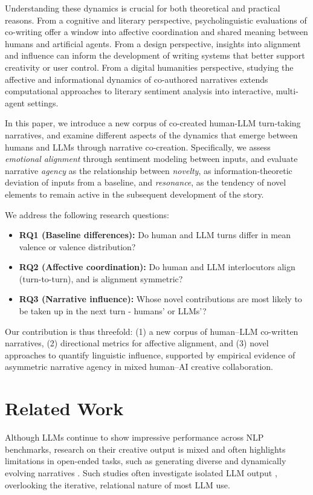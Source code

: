 \documentclass[11pt]{article}
\begin{document}
Understanding these dynamics is crucial for both theoretical and practical reasons. From a cognitive and literary perspective, psycholinguistic evaluations of co-writing offer a window into affective coordination and shared meaning between humans and artificial agents. From a design perspective, insights into alignment and influence can inform the development of writing systems that better support creativity or user control. From a digital humanities perspective, studying the affective and informational dynamics of co-authored narratives extends computational approaches to literary sentiment analysis into interactive, multi-agent settings.

In this paper, we introduce a new corpus of co-created human-LLM turn-taking narratives, and examine different aspects of the dynamics that emerge between humans and LLMs through narrative co-creation. Specifically, we assess \textit{emotional alignment} through sentiment modeling between inputs, and evaluate narrative \textit{agency} as the relationship between \textit{novelty}, as information-theoretic deviation of inputs from a baseline, and \textit{resonance}, as the tendency of novel elements to remain active in the subsequent development of the story.  

We address the following research questions:

\begin{itemize}
    \item \textbf{RQ1 (Baseline differences):} Do human and LLM turns differ in mean valence or valence distribution?
    \item \textbf{RQ2 (Affective coordination):} Do human and LLM interlocutors align (turn-to-turn), and is alignment symmetric?
    \item \textbf{RQ3 (Narrative influence):} Whose novel contributions are most likely to be taken up in the next turn - humans' or LLMs'?
\end{itemize}

Our contribution is thus threefold: (1) a new corpus of human–LLM co-written narratives, (2) directional metrics for affective alignment, and (3) novel approaches to quantify linguistic influence, supported by empirical evidence of asymmetric narrative agency in mixed human–AI creative collaboration.

\section{Related Work}
Although LLMs continue to show impressive performance across NLP benchmarks, research on their creative output is mixed and often highlights limitations in open-ended tasks, such as generating diverse and dynamically evolving narratives \cite{tian-etal-2024-large-language}. Such studies often investigate isolated LLM output \cite{arora2025generative}, overlooking the iterative, relational nature of most LLM use. 
\end{document}
